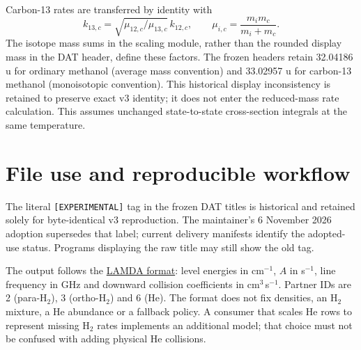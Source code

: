 \documentclass[11pt,a4paper]{article}
\begin{document}
Carbon-13 rates are transferred by identity with
\begin{equation}
k_{13,c}=\sqrt{\mu_{12,c}/\mu_{13,c}}\,k_{12,c},\qquad
\mu_{i,c}=\frac{m_i m_c}{m_i+m_c}.
\end{equation}
The isotope mass sums in the scaling module, rather than the rounded display
mass in the DAT header, define these factors. The frozen headers retain
32.04186 u for ordinary methanol (average mass convention) and
33.02957 u for carbon-13 methanol (monoisotopic convention). This
historical display inconsistency is retained to preserve exact v3 identity;
it does not enter the reduced-mass rate calculation. This assumes unchanged
state-to-state cross-section integrals at the same temperature.

\section{File use and reproducible workflow}
The literal \texttt{[EXPERIMENTAL]} tag in the frozen DAT titles is historical
and retained solely for byte-identical v3 reproduction. The maintainer's
6 November 2026 adoption supersedes that label; current delivery manifests
identify the adopted-use status. Programs displaying the raw title may still
show the old tag.

The output follows the
\href{https://home.strw.leidenuniv.nl/~moldata/molformat.html}{LAMDA format}:
level energies in cm$^{-1}$, $A$ in s$^{-1}$, line frequency in GHz and
downward collision coefficients in cm$^3$\,s$^{-1}$. Partner IDs are 2
(para-H$_2$), 3 (ortho-H$_2$) and 6 (He). The format does not fix densities,
an H$_2$ mixture, a He abundance or a fallback policy. A consumer that scales
He rows to represent missing H$_2$ rates implements an additional model;
that choice must not be confused with adding physical He collisions.
\end{document}
